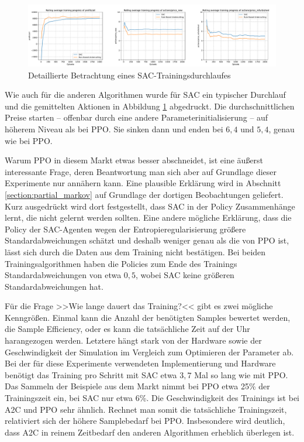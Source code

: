 \begin{figure}[htb]
	\centering
	\includegraphics[width=\textwidth]{main/sac_detailed_analysis.pdf}
	\caption{Detaillierte Betrachtung eines SAC-Trainingsdurchlaufes}
	\label{graphic:SACDetails}
\end{figure}

Wie auch für die anderen Algorithmen wurde für SAC ein typischer Durchlauf und die gemittelten Aktionen in Abbildung \ref{graphic:SACDetails} abgedruckt.
Die durchschnittlichen Preise starten -- offenbar durch eine andere Parameterinitialisierung -- auf höherem Niveau als bei PPO.
Sie sinken dann und enden bei $6,4$ und $5,4$, genau wie bei PPO.

Warum PPO in diesem Markt etwas besser abschneidet, ist eine äußerst interessante Frage, deren Beantwortung man sich aber auf Grundlage dieser Experimente nur annähern kann.
Eine plausible Erklärung wird in Abschnitt \ref{section:partial_markov} auf Grundlage der dortigen Beobachtungen geliefert.
Kurz ausgedrückt wird dort festgestellt, dass SAC in der Policy Zusammenhänge lernt, die nicht gelernt werden sollten.
Eine andere mögliche Erklärung, dass die Policy der SAC-Agenten wegen der Entropieregularisierung größere Standardabweichungen schätzt und deshalb weniger genau als die von PPO ist, lässt sich durch die Daten aus dem Training nicht bestätigen.
Bei beiden Trainingsalgorithmen haben die Policies zum Ende des Trainings Standardabweichungen von etwa $0,5$, wobei SAC keine größeren Standardabweichungen hat.

Für die Frage >>Wie lange dauert das Training?<< gibt es zwei mögliche Kenngrößen.
Einmal kann die Anzahl der benötigten Samples bewertet werden, die Sample Efficiency, oder es kann die tatsächliche Zeit auf der Uhr harangezogen werden.
Letztere hängt stark von der Hardware sowie der Geschwindigkeit der Simulation im Vergleich zum Optimieren der Parameter ab.
Bei der für diese Experimente verwendeten Implementierung und Hardware benötigt das Training pro Schritt mit SAC etwa $3,7$ Mal so lang wie mit PPO.
Das Sammeln der Beispiele aus dem Markt nimmt bei PPO etwa 25\% der Trainingszeit ein, bei SAC nur etwa 6\%.
Die Geschwindigkeit des Trainings ist bei A2C und PPO sehr ähnlich.
Rechnet man somit die tatsächliche Trainingszeit, relativiert sich der höhere Samplebedarf bei PPO.
Insbesondere wird deutlich, dass A2C in reinem Zeitbedarf den anderen Algorithmen erheblich überlegen ist.

